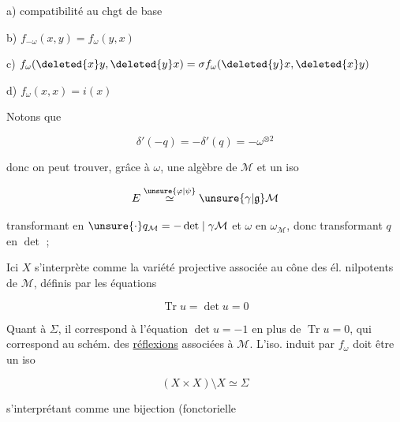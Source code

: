 
a) compatibilité au chgt de base

b)  \hfill $f_{-\omega}(x,y)=f_\omega(y,x)$

c) $f_\omega(\deleted{x}y,\deleted{y}x)=\sigma f_\omega(\deleted{y}x,\deleted{x}y)$

d) $f_\omega(x,x)=i(x)$



Notons que

\[
\delta'(-q)=-\delta'(q)=-\omega^{\otimes2}
\]

donc  on peut trouver, grâce à $\omega$, une algèbre de  $\mathcal M$ et un iso

\[
E\overset{\unsure{\varphi|\psi}}{\simeq}\unsure{\gamma|\mathfrak g}\mathcal M
\]

transformant  en $\unsure{\cdot}q_{\mathcal M}=-\det\mid\gamma\mathcal M$ et $\omega$ en $\omega_{\mathcal M}$, donc transformant $q$ en $\det$ ; 



Ici $X$ s'interprète comme la variété projective associée au cône des él.  nilpotents de $\mathcal M$, définis par les équations

\[
\operatorname{Tr}u=\det u=0
\]

Quant à $\Sigma$, il correspond à l'équation $\det u=-1$ en plus de $\operatorname{Tr}u=0$, qui correspond au schém. des \uline{réflexions} associées à $\mathcal M$. L'iso. induit par $f_\omega$ doit être un iso

\[
(X\times X)\setminus X\simeq\Sigma
\]

s'interprétant comme une bijection (fonctorielle

